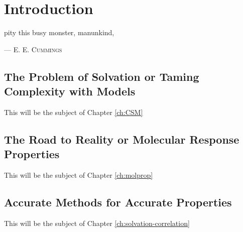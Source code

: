 \chapter*{Introduction}

\epigraph{
pity this busy monster, manunkind,
    }{
    --- \textsc{E. E. Cummings}}

\section*{The Problem of Solvation or Taming Complexity with Models}

\autocite{Anderson1972-ai}

This will be the subject of Chapter \ref{ch:CSM}

\section*{The Road to Reality or Molecular Response Properties}

This will be the subject of Chapter \ref{ch:molprop}

\section*{Accurate Methods for Accurate Properties}

This will be the subject of Chapter \ref{ch:solvation-correlation}
